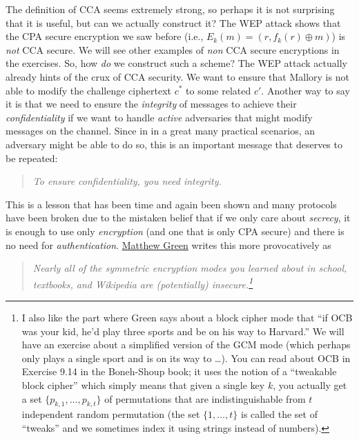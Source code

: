 The definition of CCA seems extremely strong, so perhaps it is not
surprising that it is useful, but can we actually construct it? The WEP
attack shows that the CPA secure encryption we saw before (i.e.,
\(E_k(m)=(r,f_k(r)\oplus m)\)) is \emph{not} CCA secure. We will see
other examples of \emph{non} CCA secure encryptions in the exercises.
So, how \emph{do} we construct such a scheme? The WEP attack actually
already hints of the crux of CCA security. We want to ensure that
Mallory is not able to modify the challenge ciphertext \(c^*\) to some
related \(c'\). Another way to say it is that we need to ensure the
\emph{integrity} of messages to achieve their \emph{confidentiality} if
we want to handle \emph{active} adversaries that might modify messages
on the channel. Since in in a great many practical scenarios, an
adversary might be able to do so, this is an important message that
deserves to be repeated:

\begin{quote}
\emph{To ensure confidentiality, you need integrity.}
\end{quote}

This is a lesson that has been time and again been shown and many
protocols have been broken due to the mistaken belief that if we only
care about \emph{secrecy}, it is enough to use only \emph{encryption}
(and one that is only CPA secure) and there is no need for
\emph{authentication}.
\href{http://blog.cryptographyengineering.com/2012/05/how-to-choose-authenticated-encryption.html}{Matthew
Green} writes this more provocatively as

\begin{quote}
\emph{Nearly all of the symmetric encryption modes you learned about in
school, textbooks, and Wikipedia are (potentially) insecure.\footnote{I
  also like the part where Green says about a block cipher mode that
  ``if OCB was your kid, he'd play three sports and be on his way to
  Harvard.'' We will have an exercise about a simplified version of the
  GCM mode (which perhaps only plays a single sport and is on its way to
  \ldots). You can read about OCB in Exercise 9.14 in the Boneh-Shoup
  book; it uses the notion of a ``tweakable block cipher'' which simply
  means that given a single key \(k\), you actually get a set
  \(\{ p_{k,1},\ldots,p_{k,t} \}\) of permutations that are
  indistinguishable from \(t\) independent random permutation (the set
  \(\{1,\ldots, t\}\) is called the set of ``tweaks'' and we sometimes
  index it using strings instead of numbers).}}
\end{quote}

